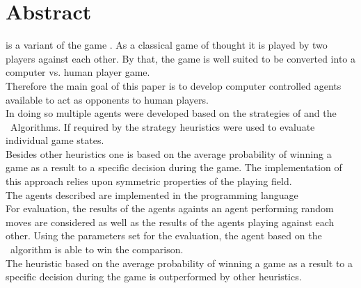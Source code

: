 \chapter*{Abstract}

\mxZitat{\ot} is a variant of the game . As a classical game of thought it is played by two players against each other. By that, the game is well suited to be converted into a computer vs. human player game.
\\Therefore the main goal of this paper is to develop computer controlled agents available to act as opponents to human players.
\\In doing so multiple agents were developed based on the strategies of \abp and the \mc\ Algorithms. If required by the strategy heuristics were used to evaluate individual game states.
\\Besides other heuristics one is based on the average probability of winning a game as a result to a specific decision during the game. The implementation of this approach relies upon symmetric properties of the playing field.
\\The agents described are implemented in the programming language 
\\For evaluation, the results of the agents againts an agent performing random moves are considered as well as the results of the agents playing against each other. Using the parameters set for the evaluation, the agent based on the \mc\ algorithm is able to win the comparison.
\\The heuristic based on the average probability of winning a game as a result to a specific decision during the game is outperformed by other heuristics.